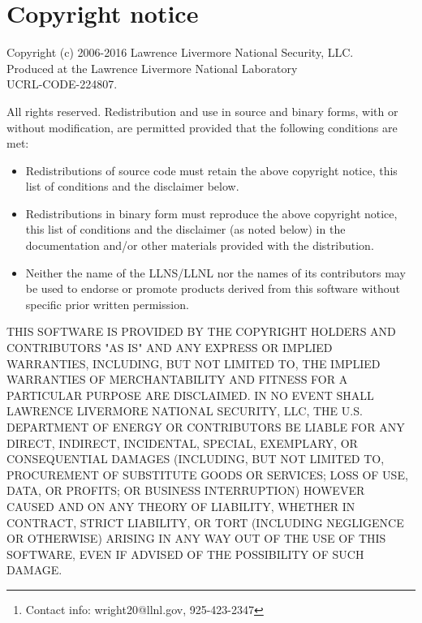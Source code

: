 \documentclass[fleqn,11pt]{article}
\date{October 17, 2016}
\author{
J\'er\^ome M. Verbeke, Chris Hagmann, Doug Wright\footnote{
Contact info: wright20@llnl.gov, 925-423-2347}\\
\\
Lawrence Livermore National Laboratory
}
\begin{document}
\maketitle

\tableofcontents
\clearpage


\newpage \section*{Copyright notice}
Copyright (c) 2006-2016 Lawrence Livermore National Security, LLC.\\
Produced at the Lawrence Livermore National Laboratory \\
UCRL-CODE-224807.

All rights reserved. Redistribution and use in source and binary forms, with or without modification, are permitted provided that the following conditions are met:

\begin{itemize}
\item  Redistributions of source code must retain the above copyright notice, this list of conditions and the disclaimer below.

\item  Redistributions in binary form must reproduce the above copyright notice, this list of conditions and the disclaimer (as noted below) in the documentation and/or other materials provided with the distribution.

\item  Neither the name of the LLNS/LLNL nor the names of its contributors may be used to endorse or promote products derived from this software without specific prior written permission.
\end{itemize}

THIS SOFTWARE IS PROVIDED BY THE COPYRIGHT HOLDERS AND CONTRIBUTORS "AS IS" AND ANY EXPRESS OR IMPLIED WARRANTIES, INCLUDING, BUT NOT LIMITED TO, THE IMPLIED WARRANTIES OF MERCHANTABILITY AND FITNESS FOR A PARTICULAR PURPOSE ARE DISCLAIMED. IN NO EVENT SHALL LAWRENCE LIVERMORE NATIONAL SECURITY, LLC, THE U.S. DEPARTMENT OF ENERGY OR CONTRIBUTORS BE LIABLE FOR ANY DIRECT, INDIRECT, INCIDENTAL, SPECIAL, EXEMPLARY, OR CONSEQUENTIAL DAMAGES (INCLUDING, BUT NOT LIMITED TO, PROCUREMENT OF SUBSTITUTE GOODS OR SERVICES; LOSS OF USE, DATA, OR PROFITS; OR BUSINESS INTERRUPTION) HOWEVER CAUSED AND ON ANY THEORY OF LIABILITY, WHETHER IN CONTRACT, STRICT LIABILITY, OR TORT (INCLUDING NEGLIGENCE OR OTHERWISE) ARISING IN ANY WAY OUT OF THE USE OF THIS SOFTWARE, EVEN IF ADVISED OF THE POSSIBILITY OF SUCH DAMAGE.
\end{document}
